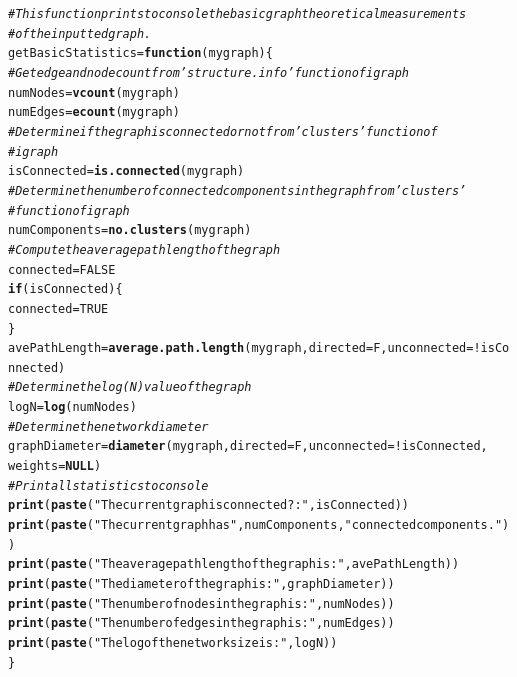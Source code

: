 \documentclass{article}\usepackage[]{graphicx}\usepackage[]{color}
\makeatletter
\newcommand{\hlnum}[1]{\textcolor[rgb]{0.686,0.059,0.569}{#1}}%
\newcommand{\hlstr}[1]{\textcolor[rgb]{0.192,0.494,0.8}{#1}}%
\newcommand{\hlcom}[1]{\textcolor[rgb]{0.678,0.584,0.686}{\textit{#1}}}%
\newcommand{\hlopt}[1]{\textcolor[rgb]{0,0,0}{#1}}%
\newcommand{\hlstd}[1]{\textcolor[rgb]{0.345,0.345,0.345}{#1}}%
\newcommand{\hlkwa}[1]{\textcolor[rgb]{0.161,0.373,0.58}{\textbf{#1}}}%
\newcommand{\hlkwb}[1]{\textcolor[rgb]{0.69,0.353,0.396}{#1}}%
\newcommand{\hlkwc}[1]{\textcolor[rgb]{0.333,0.667,0.333}{#1}}%
\newcommand{\hlkwd}[1]{\textcolor[rgb]{0.737,0.353,0.396}{\textbf{#1}}}%
\newenvironment{kframe}{%
 \def\at@end@of@kframe{}%
 \ifinner\ifhmode%
  \def\at@end@of@kframe{\end{minipage}}%
  \begin{minipage}{\columnwidth}%
 \fi\fi%
 \def\FrameCommand##1{\hskip\@totalleftmargin \hskip-\fboxsep
 \colorbox{shadecolor}{##1}\hskip-\fboxsep
     \hskip-\linewidth \hskip-\@totalleftmargin \hskip\columnwidth}%
 \MakeFramed {\advance\hsize-\width
   \@totalleftmargin\z@ \linewidth\hsize
   \@setminipage}}%
 {\par\unskip\endMakeFramed%
 \at@end@of@kframe}
\newenvironment{knitrout}{}{} %
\makeatother
\begin{document}
\begin{itemize}
\begin{knitrout}
\color{fgcolor}\begin{kframe}
\begin{alltt}
\hlcom{# This function prints to console the basic graph theoretical measurements}
\hlcom{# of the inputted graph.}
\hlstd{getBasicStatistics} \hlkwb{=} \hlkwa{function}\hlstd{(}\hlkwc{mygraph}\hlstd{) \{}
    \hlcom{# Get edge and node count from 'structure.info' function of igraph}
    \hlstd{numNodes} \hlkwb{=} \hlkwd{vcount}\hlstd{(mygraph)}
    \hlstd{numEdges} \hlkwb{=} \hlkwd{ecount}\hlstd{(mygraph)}
    \hlcom{# Determine if the graph is connected or not from 'clusters' function of}
    \hlcom{# igraph}
    \hlstd{isConnected} \hlkwb{=} \hlkwd{is.connected}\hlstd{(mygraph)}
    \hlcom{# Determine the number of connected components in the graph from 'clusters'}
    \hlcom{# function of igraph}
    \hlstd{numComponents} \hlkwb{=} \hlkwd{no.clusters}\hlstd{(mygraph)}
    \hlcom{# Compute the average path length of the graph}
    \hlstd{connected} \hlkwb{=} \hlnum{FALSE}
    \hlkwa{if} \hlstd{(isConnected) \{}
        \hlstd{connected} \hlkwb{=} \hlnum{TRUE}
    \hlstd{\}}
    \hlstd{avePathLength} \hlkwb{=} \hlkwd{average.path.length}\hlstd{(mygraph,} \hlkwc{directed} \hlstd{= F,} \hlkwc{unconnected} \hlstd{=} \hlopt{!}\hlstd{isConnected)}
    \hlcom{# Determine the log(N) value of the graph}
    \hlstd{logN} \hlkwb{=} \hlkwd{log}\hlstd{(numNodes)}
    \hlcom{# Determine the network diameter}
    \hlstd{graphDiameter} \hlkwb{=} \hlkwd{diameter}\hlstd{(mygraph,} \hlkwc{directed} \hlstd{= F,} \hlkwc{unconnected} \hlstd{=} \hlopt{!}\hlstd{isConnected,}
        \hlkwc{weights} \hlstd{=} \hlkwa{NULL}\hlstd{)}
    \hlcom{# Print all statistics to console}
    \hlkwd{print}\hlstd{(}\hlkwd{paste}\hlstd{(}\hlstr{"The current graph is connected?: "}\hlstd{, isConnected))}
    \hlkwd{print}\hlstd{(}\hlkwd{paste}\hlstd{(}\hlstr{"The current graph has "}\hlstd{, numComponents,} \hlstr{" connected components."}\hlstd{))}
    \hlkwd{print}\hlstd{(}\hlkwd{paste}\hlstd{(}\hlstr{"The average path length of the graph is: "}\hlstd{, avePathLength))}
    \hlkwd{print}\hlstd{(}\hlkwd{paste}\hlstd{(}\hlstr{"The diameter of the graph is: "}\hlstd{, graphDiameter))}
    \hlkwd{print}\hlstd{(}\hlkwd{paste}\hlstd{(}\hlstr{"The number of nodes in the graph is: "}\hlstd{, numNodes))}
    \hlkwd{print}\hlstd{(}\hlkwd{paste}\hlstd{(}\hlstr{"The number of edges in the graph is: "}\hlstd{, numEdges))}
    \hlkwd{print}\hlstd{(}\hlkwd{paste}\hlstd{(}\hlstr{"The log of the network size is: "}\hlstd{, logN))}
\hlstd{\}}
\end{alltt}
\end{kframe}
\end{knitrout}



\end{itemize}
\end{document}
